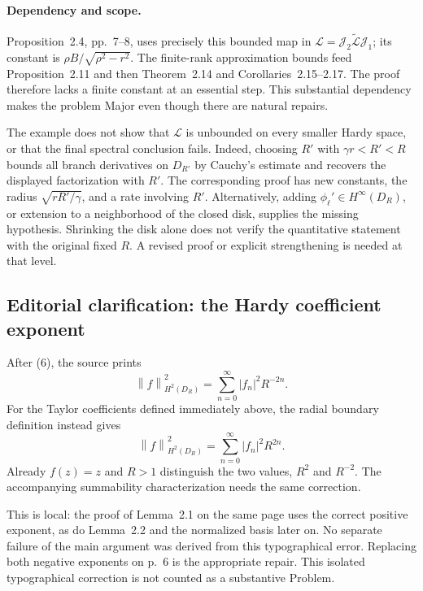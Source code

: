 \documentclass[10pt]{article}
\begin{document}
\paragraph*{Dependency and scope.}\mbox{}\par
Proposition 2.4, pp. 7–8, uses precisely this bounded map in \(\mathcal L=\mathcal J_2\widetilde{\mathcal L}\mathcal J_1\); its constant is \(\rho B/\sqrt{\rho^2-r^2}\). The finite-rank approximation bounds feed Proposition 2.11 and then Theorem 2.14 and Corollaries 2.15–2.17. The proof therefore lacks a finite constant at an essential step. This substantial dependency makes the problem Major even though there are natural repairs.\par
The example does not show that \(\mathcal L\) is unbounded on every smaller Hardy space, or that the final spectral conclusion fails. Indeed, choosing \(R'\) with \(\gamma r<R'<R\) bounds all branch derivatives on \(D_{R'}\) by Cauchy’s estimate and recovers the displayed factorization with \(R'\). The corresponding proof has new constants, the radius \(\sqrt{rR'/\gamma}\), and a rate involving \(R'\). Alternatively, adding \(\phi_\ell'\in H^\infty(D_R)\), or extension to a neighborhood of the closed disk, supplies the missing hypothesis. Shrinking the disk alone does not verify the quantitative statement with the original fixed \(R\). A revised proof or explicit strengthening is needed at that level.\par
\subsection*{Editorial clarification: the Hardy coefficient exponent}
After (6), the source prints \[\left\lVert f\right\rVert_{H^2(D_R)}^2=\sum_{n=0}^\infty |f_n|^2 R^{-2n}.\] For the Taylor coefficients defined immediately above, the radial boundary definition instead gives \[\left\lVert f\right\rVert_{H^2(D_R)}^2=\sum_{n=0}^\infty |f_n|^2 R^{2n}.\] Already \(f(z)=z\) and \(R>1\) distinguish the two values, \(R^2\) and \(R^{-2}\). The accompanying summability characterization needs the same correction.\par
This is local: the proof of Lemma 2.1 on the same page uses the correct positive exponent, as do Lemma 2.2 and the normalized basis later on. No separate failure of the main argument was derived from this typographical error. Replacing both negative exponents on p. 6 is the appropriate repair. This isolated typographical correction is not counted as a substantive Problem.\par
\end{document}
